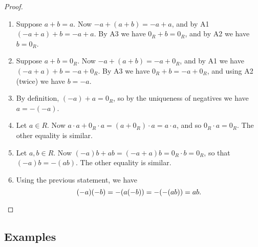 \documentclass{article}
\begin{document}
\begin{proof} \mbox{}
\begin{enumerate}
\item Suppose $a+b = a$. Now $-a + (a+b) = -a + a$, and by A1 $(-a + a) + b = -a + a$. By A3 we have $0_R + b = 0_R$, and by A2 we have $b = 0_R$.
\item Suppose $a + b = 0_R$. Now $-a + (a+b) = -a + 0_R$, and by A1 we have $(-a+a)+b = -a+0_R$. By A3 we have $0_R + b = -a + 0_R$, and using A2 (twice) we have $b = -a$.
\item By definition, $(-a) + a = 0_R$, so by the uniqueness of negatives we have $a = -(-a)$.
\item Let $a \in R$. Now $a \cdot a + 0_R \cdot a = (a + 0_R) \cdot a = a \cdot a$, and so $0_R \cdot a = 0_R$. The other equality is similar.
\item Let $a,b \in R$. Now $(-a)b + ab = (-a + a)b = 0_R \cdot b = 0_R$, so that $(-a)b = -(ab)$. The other equality is similar.
\item Using the previous statement, we have \[ (-a)(-b) = -(a(-b)) = -(-(ab)) = ab. \qedhere \]
\end{enumerate}
\end{proof}

\subsection*{Examples}
\end{document}
